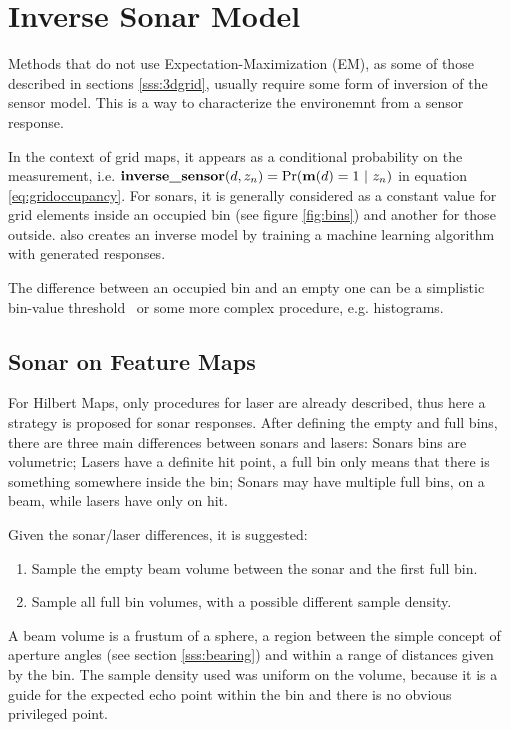 \section{Inverse Sonar Model}
\label{s:ism}
Methods that do not use Expectation-Maximization (EM), as some of those
described in sections \ref{sss:3dgrid}, usually require some form of inversion
of the sensor model. This is a way to characterize the environemnt from a sensor
response.

In the context of grid maps, it appears as a conditional probability on the
measurement, i.e.
$\text{\textbf{inverse\_sensor}}(d,z_n)=\Pr(\mathrm{\mathbf{m}}(d)=1~|~z_n)$ in equation
\ref{eq:gridoccupancy}. For sonars, it is generally considered as a constant
value for grid elements inside an occupied bin (see figure \ref{fig:bins}) and
another for those outside\cite{thrunprob}. \citet{thrunprob} also creates an
inverse model by training a machine learning algorithm with generated responses.

The difference between an occupied bin and an empty one can be a simplistic
bin-value threshold~\cite{ribas2010underwater,Moravec1985,thrunprob} or some
more complex procedure, e.g. histograms. 

\subsection{Sonar on Feature Maps}
\label{ss:isfm}
For Hilbert Maps, only procedures for
laser are already described, thus here a strategy is proposed for sonar
responses. After defining the empty and full bins, there are three main
differences between sonars and lasers: Sonars bins are volumetric; Lasers have a
definite hit point, a full bin only means that there is something somewhere
inside the bin; Sonars may have multiple full bins, on a beam, while lasers have
only on hit.

Given the sonar/laser differences, it is suggested:
\begin{enumerate}[I]
  \item Sample the empty beam volume between the sonar and the first full bin.
  \item Sample all full bin volumes, with a possible different sample density. 
\end{enumerate}

A beam volume is a frustum of a sphere, a region between the simple concept of
aperture angles (see section \ref{sss:bearing}) and within a range of distances
given by the bin. The sample density used was uniform on the volume, because
it is a guide for the expected echo point within the bin and there is no obvious
privileged point.

